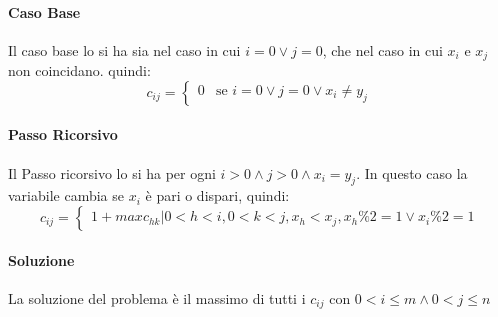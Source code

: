 \documentclass[12pt, a4paper, openany]{book}
\begin{document}
\paragraph*{Caso Base}
Il caso base lo si ha sia nel caso in cui $i = 0 \vee j=0$, che nel caso in cui $x_i$ e $x_j$ non coincidano. quindi:
$$c_{ij} = \begin{cases}
	0 & \text{se } i=0 \vee j=0 \vee x_i\neq y_j
\end{cases}
$$
\paragraph*{Passo Ricorsivo}
Il Passo ricorsivo lo si ha per ogni $i>0 \wedge j>0 \wedge x_i=y_j$.
In questo caso la variabile cambia se $x_i$ è pari o dispari, quindi:
$$c_{ij}= \begin{cases}
	1 + max{c_{hk}|0<h<i,0<k<j, x_h<x_j, x_h\%2 = 1 \vee x_i\%2=1}
\end{cases}
$$

\paragraph*{Soluzione}
La soluzione del problema è il massimo di tutti i $c_{ij}$ con $0<i\leq m \wedge 0<j \leq n$
\end{document}
